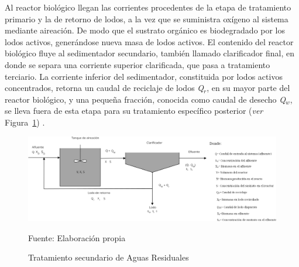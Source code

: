 Al reactor biológico llegan las corrientes procedentes de la etapa de tratamiento primario y la de retorno de lodos, a la vez que se suministra oxígeno al sistema mediante aireación. De modo que el sustrato orgánico es biodegradado por los lodos activos, generándose nueva masa de lodos activos. El contenido del reactor biológico fluye al sedimentador secundario, también llamado clarificador final, en donde se separa una corriente superior clarificada, que pasa a tratamiento terciario. La corriente inferior del sedimentador, constituida por lodos activos concentrados, retorna un caudal de reciclaje de lodos \emph{Q$_{r}$}, en su mayor parte del reactor biológico, y una pequeña fracción, conocida como caudal de desecho \emph{Q$_{w}$}, se lleva fuera de esta etapa para su tratamiento específico posterior (\emph{ver} Figura~\ref{fig:balance}) \emph{\citep{manuel13}}.
	\begin{figure}[!h]
		\centering
		\includegraphics[scale=0.52]{Diagrama_de_flujo.png}
		\caption{Tratamiento secundario de Aguas Residuales}
		\small{Fuente: Elaboración propia}
		\label{fig:balance}
	\end{figure}
